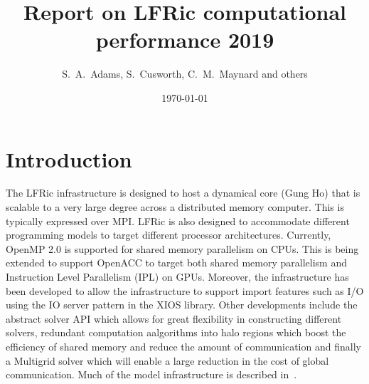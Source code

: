 \documentclass[11pt]{article}
\author{S.~A.~Adams, S.~Cusworth, C.~M.~Maynard and others}
\title{Report on LFRic computational performance 2019}
\date{\today}
\begin{document}
\maketitle
\medskip
\section{Introduction\label{sec:intro}}
The LFRic infrastructure is designed to host a dynamical core (Gung Ho)
that is scalable to a very large degree across a distributed memory
computer. This is typically expressed over MPI. LFRic is also designed
to accommodate different programming models to target different
processor architectures. Currently, OpenMP 2.0 is supported for shared
memory parallelism on CPUs. This is being extended to support OpenACC
to target both shared memory parallelism and Instruction Level
Parallelism (IPL) on GPUs. Moreover, the infrastructure has been
developed to allow the infrastructure to support import features such
as I/O using the IO server pattern in the XIOS library. Other
developments include the abstract solver API which allows for great
flexibility in constructing different solvers, redundant computation
aalgorithms into halo regions which boost the efficiency of shared
memory and reduce the amount of communication and finally a Multigrid
solver which will enable a large reduction in the cost of global communication.
Much of the model infrastructure is described in~\cite{LFRic}.





\end{document}
